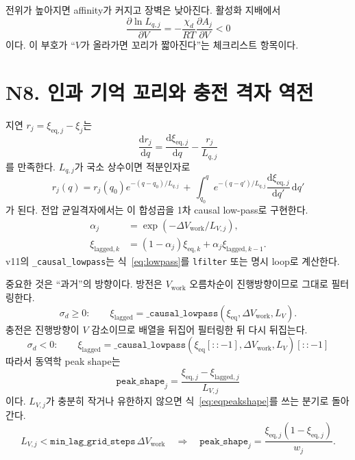 \documentclass[11pt,a4paper]{article}
\newcommand{\dd}{\mathrm{d}}
\newcommand{\eq}{\mathrm{eq}}
\newcommand{\work}{\mathrm{work}}
\newcommand{\lag}{\mathrm{lagged}}
\begin{document}
전위가 높아지면 affinity가 커지고 장벽은 낮아진다. 활성화 지배에서
\begin{equation}
\frac{\partial\ln L_{q,j}}{\partial V}
=-\frac{\chi_d}{RT}\frac{\partial A_j}{\partial V}<0
\label{eq:dlnLdV}
\end{equation}
이다. 이 부호가 ``$V$가 올라가면 꼬리가 짧아진다''는 체크리스트 항목이다.

\section{N8. 인과 기억 꼬리와 충전 격자 역전}\label{sec:N8}
지연 $r_j=\xi_{\eq,j}-\xi_j$는
\begin{equation}
\frac{\dd r_j}{\dd q}=\frac{\dd \xi_{\eq,j}}{\dd q}-\frac{r_j}{L_{q,j}}
\label{eq:rodeo}
\end{equation}
를 만족한다. $L_{q,j}$가 국소 상수이면 적분인자로
\begin{equation}
r_j(q)=r_j(q_0)e^{-(q-q_0)/L_{q,j}}
\,+\,\int_{q_0}^{q}
e^{-(q-q')/L_{q,j}}\frac{\dd\xi_{\eq,j}}{\dd q'}\,\dd q'
\label{eq:memory}
\end{equation}
가 된다. 전압 균일격자에서는 이 합성곱을 1차 causal low-pass로 구현한다.
\begin{align}
\alpha_j&=\exp(-\Delta V_{\work}/L_{V,j}),\label{eq:alpha}\\
\xi_{\lag,k}&=(1-\alpha_j)\xi_{\eq,k}+\alpha_j\xi_{\lag,k-1}.
\label{eq:lowpass}
\end{align}
v11의 \texttt{\_causal\_lowpass}는 식~\eqref{eq:lowpass}를 \texttt{lfilter} 또는 명시 loop로 계산한다.

중요한 것은 ``과거''의 방향이다. 방전은 $V_{\work}$ 오름차순이 진행방향이므로 그대로 필터링한다.
\begin{equation}
\sigma_d\ge0:\qquad
\xi_{\lag}=\texttt{\_causal\_lowpass}(\xi_{\eq},\Delta V_{\work},L_V).
\label{eq:dislowpass}
\end{equation}
충전은 진행방향이 $V$ 감소이므로 배열을 뒤집어 필터링한 뒤 다시 뒤집는다.
\begin{equation}
\boxed{\;\sigma_d<0:\qquad
\xi_{\lag}=
\texttt{\_causal\_lowpass}(\xi_{\eq}[::-1],\Delta V_{\work},L_V)[::-1]\;}
\label{eq:chargelowpass}
\end{equation}
따라서 동역학 peak shape는
\begin{equation}
\boxed{\;\texttt{peak\_shape}_j
=\frac{\xi_{\eq,j}-\xi_{\lag,j}}{L_{V,j}}\;}
\label{eq:tailpeak}
\end{equation}
이다. $L_{V,j}$가 충분히 작거나 유한하지 않으면 식~\eqref{eq:eqpeakshape}를 쓰는 분기로 돌아간다.
\begin{equation}
L_{V,j}<\texttt{min\_lag\_grid\_steps}\,\Delta V_{\work}
\quad\Longrightarrow\quad
\texttt{peak\_shape}_j=\frac{\xi_{\eq,j}(1-\xi_{\eq,j})}{w_j}.
\label{eq:minlagbranch}
\end{equation}
\end{document}
